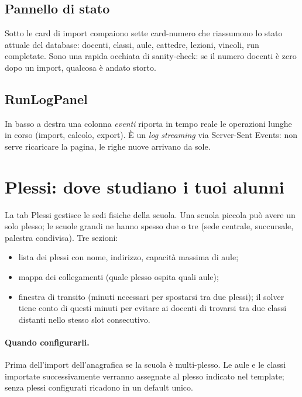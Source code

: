 \subsection{Pannello di stato}

Sotto le card di import compaiono sette card-numero che
riassumono lo stato attuale del database: docenti, classi,
aule, cattedre, lezioni, vincoli, run completate. Sono una
rapida occhiata di sanity-check: se il numero docenti \`e zero
dopo un import, qualcosa \`e andato storto.

\subsection{RunLogPanel}

In basso a destra una colonna \emph{eventi} riporta in tempo
reale le operazioni lunghe in corso (import, calcolo, export).
\`E un \emph{log streaming} via Server-Sent Events: non serve
ricaricare la pagina, le righe nuove arrivano da sole.


\section{Plessi: dove studiano i tuoi alunni}
\label{sec:tab_plessi}

La tab Plessi gestisce le sedi fisiche della scuola. Una scuola
piccola pu\`o avere un solo plesso; le scuole grandi ne hanno
spesso due o tre (sede centrale, succursale, palestra
condivisa). Tre sezioni:

\begin{itemize}
\item lista dei plessi con nome, indirizzo, capacit\`a
  massima di aule;
\item mappa dei collegamenti (quale plesso ospita quali aule);
\item finestra di transito (minuti necessari per spostarsi tra
  due plessi); il solver tiene conto di questi minuti per
  evitare ai docenti di trovarsi tra due classi distanti nello
  stesso slot consecutivo.
\end{itemize}

\paragraph{Quando configurarli.} Prima dell'import dell'anagrafica
se la scuola \`e multi-plesso. Le aule e le classi importate
successivamente verranno assegnate al plesso indicato nel
template; senza plessi configurati ricadono in un default unico.

